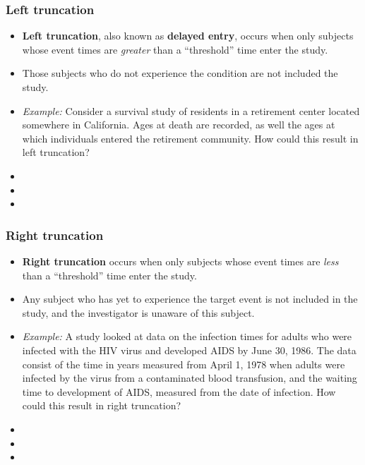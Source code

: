 \begin{frame}
\frametitle{Left truncation}
\begin{itemize}
\item  \textbf{Left truncation}, also known as \textbf{delayed entry}, occurs when only subjects whose event times are \emph{greater} than a ``threshold'' time enter the study.
\item Those subjects who do not experience the condition are not included the study.
\item \emph{Example:}  Consider a survival study of residents in a retirement center located somewhere in California.  Ages at death are recorded, as well the ages at which individuals entered the retirement community. How could this result in left truncation?
\item[]
\item[]
\item[]
\end{itemize}
\end{frame}

\begin{frame}
\frametitle{Right truncation}
\begin{itemize}
\item  \textbf{Right truncation} occurs when only subjects whose event times are \emph{less} than a ``threshold'' time enter the study.
\item Any subject who has yet to experience the target event is not included in the study, and the investigator is unaware of this subject.
\item \emph{Example:}  A study looked at data on the infection times for adults who were infected with the HIV virus and developed AIDS by June 30, 1986.  The data consist of the time in years measured from April 1, 1978 when adults were infected by the virus from a contaminated blood transfusion, and the waiting time to development of AIDS, measured from the date of infection.  How could this result in right truncation?
\item[]
\item[]
\item[]
\end{itemize}
\end{frame}


